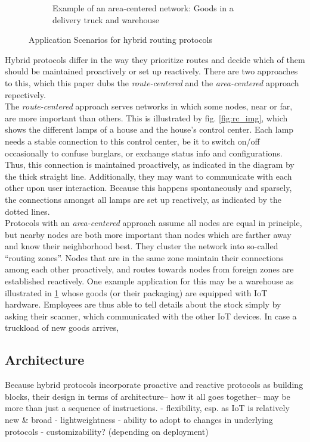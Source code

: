 \documentclass[a4paper,10pt]{scrartcl}
\begin{document}
\begin{figure}
\begin{subfigure}[b]{0.5\textwidth}
                \caption{Example of an area-centered network: Goods in a delivery truck and warehouse}
                \label{fig:ac_img}
        \end{subfigure}
        \caption{Application Scenarios for hybrid routing protocols}\label{fig:scope}
\end{figure}

Hybrid protocols differ in the way they prioritize routes and decide which of them should be maintained proactively or set up reactively. There are two approaches to this, which this paper dubs the \emph{route-centered} and the \emph{area-centered} approach repectively.\\

The \emph{route-centered} approach serves networks in which some nodes, near or far, are more important than others. This is illustrated by fig. \ref{fig:rc_img}, which shows the different lamps of a house and the house's control center. Each lamp needs a stable connection to this control center, be it to switch on/off occasionally to confuse burglars, or exchange status info and configurations. Thus, this connection is maintained proactively, as indicated in the diagram by the thick straight line. Additionally, they may want to communicate with each other upon user interaction. Because this happens spontaneously and sparsely, the connections amongst all lamps are set up reactively, as indicated by the dotted lines.\\
Protocols with an \emph{area-centered} approach assume all nodes are equal in principle, but nearby nodes are both more important than nodes which are farther away and know their neighborhood best. They cluster the network into so-called ``routing zones''. Nodes that are in the same zone maintain their connections among each other proactively, and routes towards nodes from foreign zones are established reactively. 
One example application for this may be a warehouse as illustrated in \ref{fig:ac_img} whose goods (or their packaging) are equipped with IoT hardware. Employees are thus able to tell details about the stock simply by asking their scanner, which communicated with the other IoT devices. In case a truckload of new goods arrives, 

\subsection{Architecture}
\label{subsec:architecture}
Because hybrid protocols incorporate proactive and reactive protocols as building blocks, their design in terms of architecture-- how it all goes together-- may be more than just a sequence of instructions.
- flexibility, esp. as IoT is relatively new \& broad
- lightweightness
- ability to adopt to changes in underlying protocols
- customizability? (depending on deployment)
\end{document}
